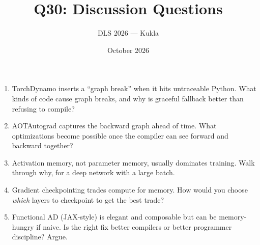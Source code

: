 \documentclass[11pt]{article}
\title{Q30: Discussion Questions}
\author{DLS 2026 --- Kukla}
\date{October 2026}
\begin{document}
\maketitle
\begin{enumerate}[leftmargin=1.5em]
\item TorchDynamo inserts a ``graph break'' when it hits untraceable Python. What kinds of code cause graph breaks, and why is graceful fallback better than refusing to compile?
\item AOTAutograd captures the backward graph ahead of time. What optimizations become possible once the compiler can see forward and backward together?
\item Activation memory, not parameter memory, usually dominates training. Walk through why, for a deep network with a large batch.
\item Gradient checkpointing trades compute for memory. How would you choose \emph{which} layers to checkpoint to get the best trade?
\item Functional AD (JAX-style) is elegant and composable but can be memory-hungry if naive. Is the right fix better compilers or better programmer discipline? Argue.
\end{enumerate}
\end{document}
